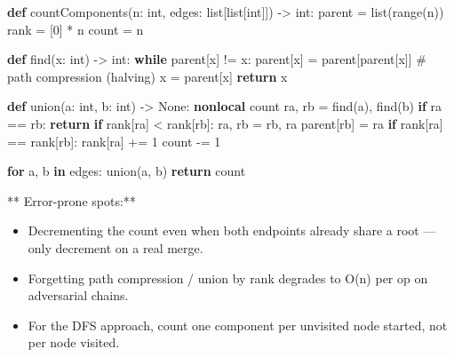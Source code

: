 \documentclass[11pt]{article}
\providecommand{\tightlist}{\setlength{\itemsep}{1pt}\setlength{\parskip}{0pt}}
\newenvironment{Shaded}{\begin{snugshade}}{\end{snugshade}}
\newcommand{\BuiltInTok}[1]{\textcolor[rgb]{0.50,0.55,0.55}{#1}}
\newcommand{\CommentTok}[1]{\textcolor[rgb]{0.48,0.49,0.49}{#1}}
\newcommand{\ControlFlowTok}[1]{\textcolor[rgb]{0.99,0.74,0.29}{\textbf{#1}}}
\newcommand{\DecValTok}[1]{\textcolor[rgb]{0.96,0.45,0.00}{#1}}
\newcommand{\KeywordTok}[1]{\textcolor[rgb]{0.81,0.81,0.76}{\textbf{#1}}}
\newcommand{\NormalTok}[1]{\textcolor[rgb]{0.81,0.81,0.76}{#1}}
\newcommand{\OperatorTok}[1]{\textcolor[rgb]{0.81,0.81,0.76}{#1}}
\newcommand{\VariableTok}[1]{\textcolor[rgb]{0.15,0.68,0.68}{#1}}
\begin{document}
\begin{Shaded}
\begin{Highlighting}[]
\KeywordTok{def}\NormalTok{ countComponents(n: }\BuiltInTok{int}\NormalTok{, edges: }\BuiltInTok{list}\NormalTok{[}\BuiltInTok{list}\NormalTok{[}\BuiltInTok{int}\NormalTok{]]) }\OperatorTok{{-}\textgreater{}} \BuiltInTok{int}\NormalTok{:}
\NormalTok{    parent }\OperatorTok{=} \BuiltInTok{list}\NormalTok{(}\BuiltInTok{range}\NormalTok{(n))}
\NormalTok{    rank }\OperatorTok{=}\NormalTok{ [}\DecValTok{0}\NormalTok{] }\OperatorTok{*}\NormalTok{ n}
\NormalTok{    count }\OperatorTok{=}\NormalTok{ n}

    \KeywordTok{def}\NormalTok{ find(x: }\BuiltInTok{int}\NormalTok{) }\OperatorTok{{-}\textgreater{}} \BuiltInTok{int}\NormalTok{:}
        \ControlFlowTok{while}\NormalTok{ parent[x] }\OperatorTok{!=}\NormalTok{ x:}
\NormalTok{            parent[x] }\OperatorTok{=}\NormalTok{ parent[parent[x]]  }\CommentTok{\# path compression (halving)}
\NormalTok{            x }\OperatorTok{=}\NormalTok{ parent[x]}
        \ControlFlowTok{return}\NormalTok{ x}

    \KeywordTok{def}\NormalTok{ union(a: }\BuiltInTok{int}\NormalTok{, b: }\BuiltInTok{int}\NormalTok{) }\OperatorTok{{-}\textgreater{}} \VariableTok{None}\NormalTok{:}
        \KeywordTok{nonlocal}\NormalTok{ count}
\NormalTok{        ra, rb }\OperatorTok{=}\NormalTok{ find(a), find(b)}
        \ControlFlowTok{if}\NormalTok{ ra }\OperatorTok{==}\NormalTok{ rb:}
            \ControlFlowTok{return}
        \ControlFlowTok{if}\NormalTok{ rank[ra] }\OperatorTok{\textless{}}\NormalTok{ rank[rb]:}
\NormalTok{            ra, rb }\OperatorTok{=}\NormalTok{ rb, ra}
\NormalTok{        parent[rb] }\OperatorTok{=}\NormalTok{ ra}
        \ControlFlowTok{if}\NormalTok{ rank[ra] }\OperatorTok{==}\NormalTok{ rank[rb]:}
\NormalTok{            rank[ra] }\OperatorTok{+=} \DecValTok{1}
\NormalTok{        count }\OperatorTok{{-}=} \DecValTok{1}

    \ControlFlowTok{for}\NormalTok{ a, b }\KeywordTok{in}\NormalTok{ edges:}
\NormalTok{        union(a, b)}
    \ControlFlowTok{return}\NormalTok{ count}
\end{Highlighting}
\end{Shaded}

** Error-prone spots:**

\begin{itemize}
\tightlist
\item
  Decrementing the count even when both endpoints already share a root --- only decrement on a real merge.
\item
  Forgetting path compression / union by rank degrades to O(n) per op on adversarial chains.
\item
  For the DFS approach, count one component per unvisited node started, not per node visited.
\end{itemize}
\end{document}
